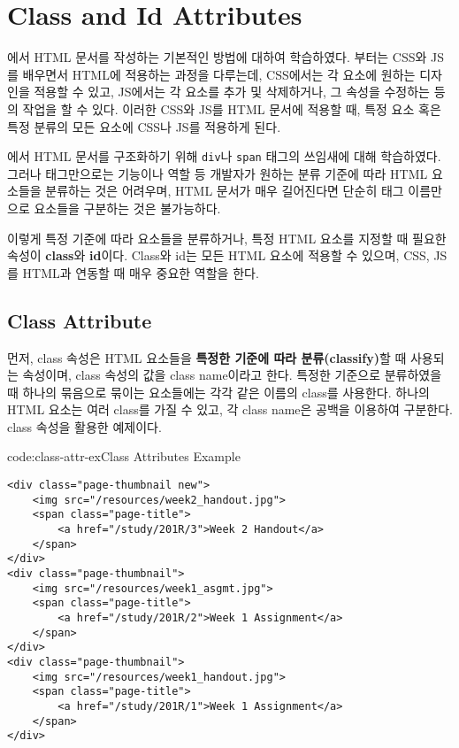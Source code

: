\section{Class and Id Attributes} \label{sect:class-and-id-attributes}

에서 HTML 문서를 작성하는 기본적인 방법에 대하여 학습하였다. 부터는 CSS와 JS를 배우면서 HTML에 적용하는 과정을 다루는데, CSS에서는 각 요소에 원하는 디자인을 적용할 수 있고, JS에서는 각 요소를 추가 및 삭제하거나, 그 속성을 수정하는 등의 작업을 할 수 있다. 이러한 CSS와 JS를 HTML 문서에 적용할 때, 특정 요소 혹은 특정 분류의 모든 요소에 CSS나 JS를 적용하게 된다.

에서 HTML 문서를 구조화하기 위해 \texttt{div}나 \texttt{span} 태그의 쓰임새에 대해 학습하였다. 그러나 태그만으로는 기능이나 역할 등 개발자가 원하는 분류 기준에 따라 HTML 요소들을 분류하는 것은 어려우며, HTML 문서가 매우 길어진다면 단순히 태그 이름만으로 요소들을 구분하는 것은 불가능하다.

이렇게 특정 기준에 따라 요소들을 분류하거나, 특정 HTML 요소를 지정할 때 필요한 속성이 \textbf{class}와 \textbf{id}이다. Class와 id는 모든 HTML 요소에 적용할 수 있으며, CSS, JS를 HTML과 연동할 때 매우 중요한 역할을 한다. 

\subsection*{Class Attribute}
먼저, class 속성은 HTML 요소들을 \textbf{특정한 기준에 따라 분류(classify)}할 때 사용되는 속성이며, class 속성의 값을 class name이라고 한다. 특정한 기준으로 분류하였을 때 하나의 묶음으로 묶이는 요소들에는 각각 같은 이름의 class를 사용한다. 하나의 HTML 요소는 여러 class를 가질 수 있고, 각 class name은 공백을 이용하여 구분한다. \은 class 속성을 활용한 예제이다.

\begin{codeenv}{code:class-attr-ex}{Class Attributes Example}\begin{verbatim}
<div class="page-thumbnail new">
    <img src="/resources/week2_handout.jpg">
    <span class="page-title">
        <a href="/study/201R/3">Week 2 Handout</a>
    </span>
</div>
<div class="page-thumbnail">
    <img src="/resources/week1_asgmt.jpg">
    <span class="page-title">
        <a href="/study/201R/2">Week 1 Assignment</a>
    </span>
</div>
<div class="page-thumbnail">
    <img src="/resources/week1_handout.jpg">
    <span class="page-title">
        <a href="/study/201R/1">Week 1 Assignment</a>
    </span>
</div>
\end{verbatim}
\end{codeenv}
\newpage

